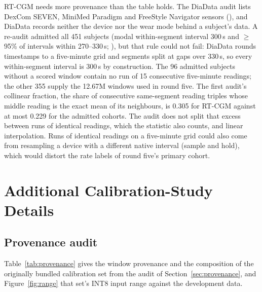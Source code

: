 \documentclass[10pt,twocolumn]{article}
\begin{document}
RT-CGM needs more provenance than the table holds. The DiaData audit lists
DexCom SEVEN, MiniMed Paradigm and FreeStyle Navigator sensors
(), and DiaData records neither the device nor
the wear mode behind a subject's data. A re-audit admitted all 451
subjects (modal within-segment interval 300\,s and $\geq$95\% of
intervals within 270--330\,s; ), but that
rule could not fail: DiaData rounds timestamps to a five-minute grid
\cite{cinar2026diadata} and segments split at gaps over 330\,s, so every
within-segment interval is 300\,s by construction. The 96 admitted
subjects without a scored window contain no run of 15 consecutive
five-minute readings; the
other 355 supply the 12.67M windows used in round five. The first audit's
collinear fraction, the share of consecutive same-segment reading triples
whose middle reading is the exact mean of its neighbours, is 0.305 for
RT-CGM against at most 0.229 for the admitted cohorts. The audit does not
split that excess between runs of identical readings, which the statistic
also counts, and linear interpolation. Runs of identical readings on a
five-minute grid could also come from resampling a device with a
different native interval (sample and hold), which would distort the rate
labels of round five's primary cohort.


\section{Additional Calibration-Study Details}
\label{app:calibdetails}

\subsection{Provenance audit}

Table~\ref{tab:provenance} gives the window provenance and the
composition of the originally bundled calibration set from the audit of
Section~\ref{sec:provenance}, and Figure~\ref{fig:range} that set's INT8
input range against the development data.
\end{document}
